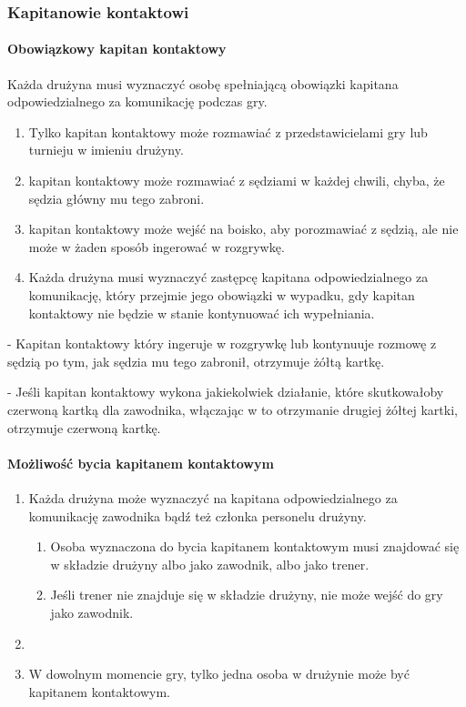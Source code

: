 \documentclass[12pt]{article}
\newcommand\redcard{\bgroup\color{red}\markoverwith{\textcolor{red}{\rule[-0.5ex]{2pt}{0.4pt}}}\ULon}
\newcommand\yellowcard{\bgroup\color{yellow}\markoverwith{\textcolor{yellow}{\rule[-0.5ex]{2pt}{0.4pt}}}\ULon}
\begin{document}
\subsubsection{Kapitanowie kontaktowi}

\paragraph{Obowiązkowy kapitan kontaktowy}
Każda drużyna musi wyznaczyć
osobę spełniającą obowiązki kapitana odpowiedzialnego za komunikację
podczas gry.

\begin{enumerate}
	\item Tylko kapitan kontaktowy może rozmawiać z przedstawicielami gry lub
	      turnieju w imieniu drużyny.

	\item kapitan kontaktowy może rozmawiać z sędziami w każdej chwili, chyba,
	      że sędzia główny mu tego zabroni.

	\item kapitan kontaktowy może wejść na boisko, aby porozmawiać z sędzią,
	      ale nie może w żaden sposób ingerować w rozgrywkę.

	\item Każda drużyna musi wyznaczyć zastępcę kapitana odpowiedzialnego za
	      komunikację, który przejmie jego obowiązki w wypadku, gdy kapitan
	      kontaktowy nie będzie w stanie kontynuować ich wypełniania.
\end{enumerate}

\yellowcard{Żółta kartka} - Kapitan kontaktowy który ingeruje w rozgrywkę lub
kontynuuje rozmowę z sędzią po tym, jak sędzia mu tego zabronił,
otrzymuje żółtą kartkę.

\redcard{Czerwona kartka} - Jeśli kapitan kontaktowy wykona jakiekolwiek
działanie, które skutkowałoby czerwoną kartką dla zawodnika, włączając w
to otrzymanie drugiej żółtej kartki, otrzymuje czerwoną kartkę.

\paragraph{Możliwość bycia kapitanem kontaktowym}

\begin{enumerate}
	\item
	      Każda drużyna może wyznaczyć na kapitana odpowiedzialnego za
	      komunikację zawodnika bądź też członka personelu drużyny.

	      \begin{enumerate}
		      \item
		            Osoba wyznaczona do bycia kapitanem kontaktowym musi znajdować się w
		            składzie drużyny albo jako zawodnik, albo jako trener.
		      \item
		            Jeśli trener nie znajduje się w składzie drużyny, nie może wejść do
		            gry jako zawodnik.
	      \end{enumerate}
	\item
	\item W dowolnym momencie gry, tylko jedna osoba w drużynie może być
	      kapitanem kontaktowym.
\end{enumerate}
\end{document}
